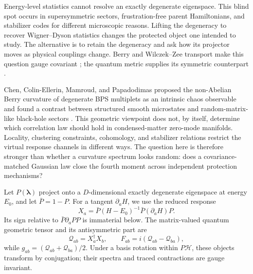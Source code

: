 \documentclass[aps,prb,reprint,superscriptaddress,longbibliography,floatfix]{revtex4-2}
\newcommand{\cQ}{\mathcal Q}
\newcommand{\cH}{\mathcal H}
\begin{document}
Energy-level statistics cannot resolve an exactly degenerate eigenspace. This blind spot occurs in supersymmetric sectors, frustration-free parent Hamiltonians, and stabilizer codes for different microscopic reasons. Lifting the degeneracy to recover Wigner--Dyson statistics changes the protected object one intended to study. The alternative is to retain the degeneracy and ask how its projector moves as physical couplings change. Berry and Wilczek--Zee transport make this question gauge covariant \cite{berry1984,wilczekzee1984}; the quantum metric supplies its symmetric counterpart \cite{provostvallee1980,kato1950}.

Chen, Colin-Ellerin, Mamroud, and Papadodimas proposed the non-Abelian Berry curvature of degenerate BPS multiplets as an intrinsic chaos observable and found a contrast between structured smooth microstates and random-matrix-like black-hole sectors \cite{chen2026berry}. This geometric viewpoint does not, by itself, determine which correlation law should hold in condensed-matter zero-mode manifolds. Locality, clustering constraints, cohomology, and stabilizer relations restrict the virtual response channels in different ways. The question here is therefore stronger than whether a curvature spectrum looks random: does a covariance-matched Gaussian law close the fourth moment across independent protection mechanisms?

Let \(P(\bm\lambda)\) project onto a \(D\)-dimensional exactly degenerate eigenspace at energy \(E_0\), and let \(\bar P=1-P\). For a tangent \(\partial_a H\), we use the reduced response
\begin{equation}
X_a=\bar P(H-E_0)^{-1}\bar P(\partial_a H)P.
\label{eq:response}
\end{equation}
Its sign relative to \(\bar P\partial_a P P\) is immaterial below. The matrix-valued quantum geometric tensor and its antisymmetric part are
\begin{equation}
\cQ_{ab}=X_a^\dagger X_b,\qquad F_{ab}=i(\cQ_{ab}-\cQ_{ba}),
\label{eq:qgt}
\end{equation}
while \(g_{ab}=(\cQ_{ab}+\cQ_{ba})/2\). Under a basis rotation within \(P\cH\), these objects transform by conjugation; their spectra and traced contractions are gauge invariant.
\end{document}
